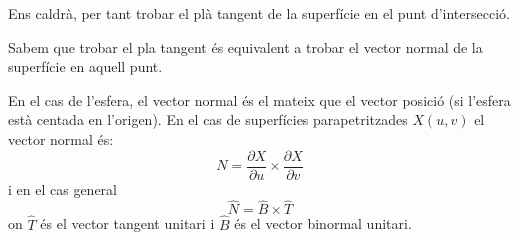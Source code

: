 \documentclass{article}
\begin{document}
Ens caldrà, per tant trobar el plà tangent de la superfície en el punt d'intersecció.


Sabem que trobar el pla tangent és equivalent a trobar el vector normal de la superfície en aquell punt.


En el cas de l'esfera, el vector normal és el mateix que el vector posició (si l'esfera està centada en l'origen). 
En el cas de superfícies parapetritzades $X(u,v)$ el vector normal és:
 \begin{equation*}
    N= \frac{\partial X}{\partial u} \times \frac{\partial X}{\partial v}
\end{equation*}
i en el cas general 
\begin{equation*}
   \hat{N}= \hat{B}\times \hat{T}
\end{equation*}
on $\hat{T}$ és el vector tangent unitari i $\hat{B}$ és el vector binormal unitari.
\end{document}
